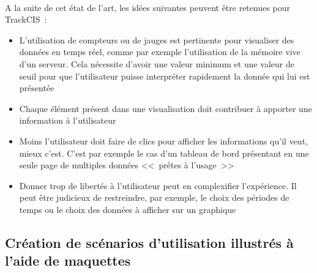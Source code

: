 			\paragraph{}
			A la suite de cet état de l'art, les idées suivantes peuvent être retenues
			pour TrackCIS~:
			\begin{itemize}
			  \item L'utilisation de compteurs ou de jauges est pertinente pour
			  visualiser des données en temps réel, comme par exemple l'utilisation de
			  la mémoire vive d'un serveur. Cela nécessite d'avoir une valeur minimum et
			  une valeur de seuil pour que l'utilisateur puisse interpréter rapidement la
			  donnée qui lui est présentée
			  \item Chaque élément présent dans une visualisation doit contribuer à
			  apporter une information à l'utilisateur
			  \item Moins l'utilisateur doit faire de clics pour afficher les
			  informations qu'il veut, mieux c'est. C'est par exemple le cas d'un tableau
			  de bord présentant en une seule page de multiples données <<~prêtes à
			  l'usage~>>
			  \item Donner trop de libertés à l'utilisateur peut en complexifier
			  l'expérience. Il peut être judicieux de restreindre, par exemple, le choix
			  des périodes de temps ou le choix des données à afficher sur un graphique
			\end{itemize}
			
		\subsection{Création de scénarios d'utilisation illustrés à l'aide de
		maquettes}
